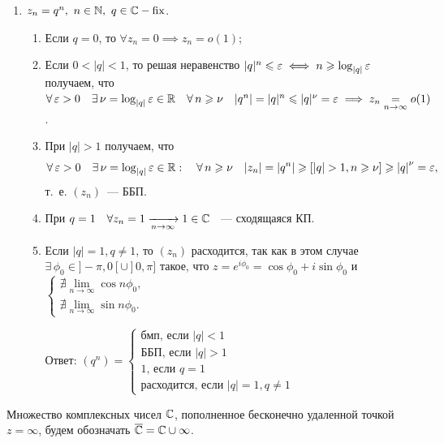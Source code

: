 \documentclass[../../main.tex]{subfiles}
\begin{document}
\begin{exmp}
	\;
	\begin{enumerate}
		\item $ z_n = q^n,\ n \in \mathbb{N},\ q \in \mathbb{C} - \operatorname{fix} $.
		
		\begin{enumerate}
			\item Если $ q = 0 $, то $ \forall z_n = 0 \implies z_n = o(1) $;
			
			\item Если $ 0 < |q| < 1 $, то решая неравенство $ |q|^n \leqslant \varepsilon \iff 
			n \geqslant \log_{|q|}\varepsilon $ получаем, что $ \forall\, \varepsilon > 0 \quad \exists\, 
			\nu = \log_{|q|}\varepsilon \in \mathbb{R} \quad \forall\, n \geqslant \nu \quad |q^n| = 
			|q|^n \leqslant |q|^\nu = \varepsilon \implies z_n \underset{n \to \infty}{=} o(1) $.
			
			\item При $ |q| > 1 $ получаем, что \[\forall\, \varepsilon > 0 \quad \exists\, 
			\nu = \log_{|q|}\varepsilon \in \mathbb{R}: \quad \forall\, n \geqslant \nu \quad |z_n| = 
			|q^n| \geqslant [|q| > 1, n \geqslant \nu] \geqslant {|q|}^{\nu} = \varepsilon,\] т.~е. 
			$(z_n)$~--- ББП.
			
			\item При $ q = 1 \quad \forall z_n = 1 \xrightarrow[n \rightarrow \infty]{} 1 \in 
			\mathbb{C} $ ~--- сходящаяся КП.
			
			\item Если $ |q| = 1, q \neq 1 $, то $ (z_n) $ расходится, так как в этом 
			случае $ \exists\, \phi_0 \in ]-\pi, 0[ \cup ]0, \pi] $ такое, что $ z = 
			e^{i\phi_0} = \cos{\phi_0} + i\sin{\phi_0} $ и 
			$ \begin{cases}
				\nexists \underset{n \to \infty}{\lim} \cos{n\phi_0}, \\
				\nexists \underset{n \to \infty}{\lim} \sin{n\phi_0}.
			\end{cases} $
			
			Ответ: 
			$ (q^n) = \begin{cases}
				\text{бмп, если } |q| < 1 \\
				\text{ББП, если } |q| > 1 \\
				1 \text{, если } q = 1 \\
				\text{расходится, если } |q| = 1, q \neq 1
			\end{cases} $
		\end{enumerate}
	\end{enumerate}
\end{exmp}

Множество комплексных чисел $ \mathbb{C} $, пополненное бесконечно удаленной точкой $ 
z = \infty $, будем обозначать $ \overline{\mathbb{C}} = \mathbb{C} \cup {\infty} $.
\end{document}
